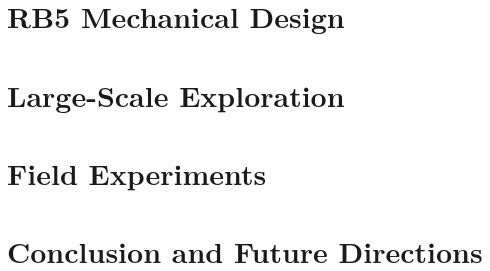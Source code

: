 \documentclass[lettersize,journal]{IEEEtran}
\begin{document}
\section{RB5 Mechanical Design}
\label{sec:md}

\section{Large-Scale Exploration}
\label{sec:le}

\section{Field Experiments}
\label{sec:fe}

\section{Conclusion and Future Directions}
\label{sec:cf}

\begin{figure*}[p]
  \vspace*{-.6cm}
  \begin{minipage}{.47\textwidth}
    \centering
    \hspace*{-1.2cm}
    \label{fig:prob1_6_2}
  \end{minipage}  
  \begin{minipage}{.25\textwidth}
    \centering
    \vspace*{-.05cm}
    \label{fig:prob1_6_1}
  \end{minipage}
  \begin{minipage}{.26\textwidth}
    \centering
    \vspace*{-.05cm}
    \label{fig:prob1_6_1}
  \end{minipage}
  \caption{}
\end{figure*}


\end{document}
